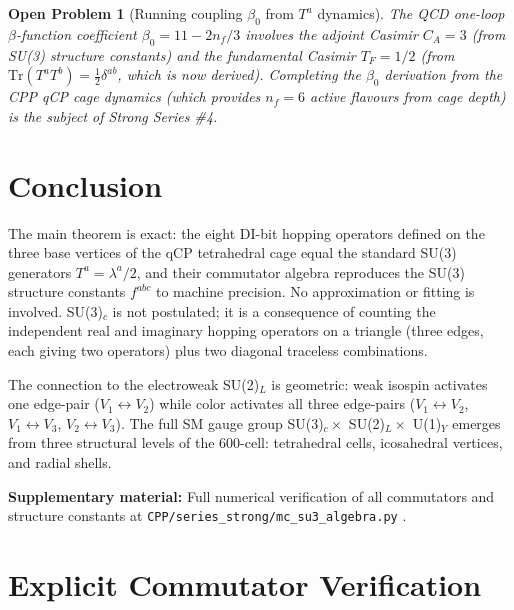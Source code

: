 \documentclass[11pt,a4paper]{article}
\newtheorem{openprob}[theorem]{Open Problem}
\begin{document}
\begin{openprob}[Running coupling $\beta_0$ from $T^a$ dynamics]
\label{op:beta}
The QCD one-loop $\beta$-function coefficient
$\beta_0 = 11 - 2n_f/3$ involves the adjoint Casimir
$C_A = 3$ (from SU(3) structure constants) and the fundamental
Casimir $T_F = 1/2$ (from $\mathrm{Tr}(T^a T^b) = \frac{1}{2}\delta^{ab}$,
which is now derived).  Completing the $\beta_0$ derivation from
the CPP qCP cage dynamics (which provides $n_f = 6$ active
flavours from cage depth) is the subject of Strong Series \#4.
\end{openprob}

\section{Conclusion}

The main theorem is exact: the eight DI-bit hopping operators
defined on the three base vertices of the qCP tetrahedral cage
equal the standard SU(3) generators $T^a = \lambda^a/2$, and their
commutator algebra reproduces the SU(3) structure constants
$f^{abc}$ to machine precision.  No approximation or fitting is
involved.  SU(3)$_c$ is not postulated; it is a consequence of
counting the independent real and imaginary hopping operators on
a triangle (three edges, each giving two operators) plus two
diagonal traceless combinations.

The connection to the electroweak SU(2)$_L$ is geometric: weak
isospin activates one edge-pair ($V_1 \leftrightarrow V_2$) while
color activates all three edge-pairs ($V_1 \leftrightarrow V_2$,
$V_1 \leftrightarrow V_3$, $V_2 \leftrightarrow V_3$).  The full
SM gauge group SU(3)$_c \times$ SU(2)$_L \times$ U(1)$_Y$ emerges
from three structural levels of the 600-cell: tetrahedral cells,
icosahedral vertices, and radial shells.

\noindent\textbf{Supplementary material:} Full numerical verification
of all commutators and structure constants at
\texttt{CPP/series\_strong/mc\_su3\_algebra.py} \citep{cpp_ss_mc}.

\appendix

\section{Explicit Commutator Verification}
\label{app:commutators}
\end{document}
